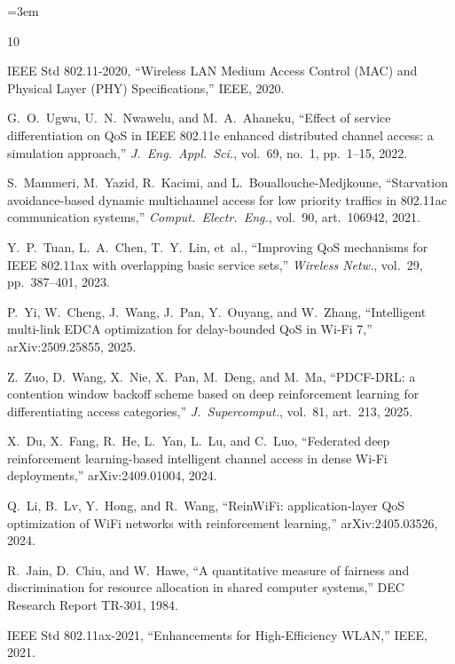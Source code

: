 \documentclass[12pt]{article}
\begin{document}

\emergencystretch=3em
\begin{thebibliography}{10}

IEEE Std 802.11-2020, ``Wireless LAN Medium Access Control (MAC) and Physical Layer (PHY) Specifications,'' IEEE, 2020.

G.~O.~Ugwu, U.~N.~Nwawelu, and M.~A.~Ahaneku, ``Effect of service differentiation on QoS in IEEE 802.11e enhanced distributed channel access: a simulation approach,'' \emph{J.~Eng.~Appl.~Sci.}, vol.~69, no.~1, pp.~1--15, 2022.

S.~Mammeri, M.~Yazid, R.~Kacimi, and L.~Bouallouche-Medjkoune, ``Starvation avoidance-based dynamic multichannel access for low priority traffics in 802.11ac communication systems,'' \emph{Comput.~Electr.~Eng.}, vol.~90, art.~106942, 2021.

Y.~P.~Tuan, L.~A.~Chen, T.~Y.~Lin, et~al., ``Improving QoS mechanisms for IEEE 802.11ax with overlapping basic service sets,'' \emph{Wireless Netw.}, vol.~29, pp.~387--401, 2023.

P.~Yi, W.~Cheng, J.~Wang, J.~Pan, Y.~Ouyang, and W.~Zhang, ``Intelligent multi-link EDCA optimization for delay-bounded QoS in Wi-Fi 7,'' arXiv:2509.25855, 2025.

Z.~Zuo, D.~Wang, X.~Nie, X.~Pan, M.~Deng, and M.~Ma, ``PDCF-DRL: a contention window backoff scheme based on deep reinforcement learning for differentiating access categories,'' \emph{J.~Supercomput.}, vol.~81, art.~213, 2025.

X.~Du, X.~Fang, R.~He, L.~Yan, L.~Lu, and C.~Luo, ``Federated deep reinforcement learning-based intelligent channel access in dense Wi-Fi deployments,'' arXiv:2409.01004, 2024.

Q.~Li, B.~Lv, Y.~Hong, and R.~Wang, ``ReinWiFi: application-layer QoS optimization of WiFi networks with reinforcement learning,'' arXiv:2405.03526, 2024.

R.~Jain, D.~Chiu, and W.~Hawe, ``A quantitative measure of fairness and discrimination for resource allocation in shared computer systems,'' DEC Research Report TR-301, 1984.

IEEE Std 802.11ax-2021, ``Enhancements for High-Efficiency WLAN,'' IEEE, 2021.

\end{thebibliography}
\end{document}
